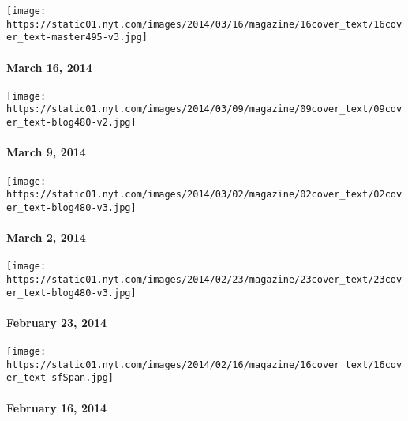 \href{http://www.nytimes.com/indexes/2014/03/16/magazine/index.html}{}

\texttt{[image: https://static01.nyt.com/images/2014/03/16/magazine/16cover\_text/16cover\_text-master495-v3.jpg]}

\hypertarget{march-16-2014}{%
\paragraph{March 16, 2014}\label{march-16-2014}}

\href{http://www.nytimes.com/indexes/2014/03/09/magazine/index.html}{}

\texttt{[image: https://static01.nyt.com/images/2014/03/09/magazine/09cover\_text/09cover\_text-blog480-v2.jpg]}

\hypertarget{march-9-2014}{%
\paragraph{March 9, 2014}\label{march-9-2014}}

\href{http://www.nytimes.com/indexes/2014/03/02/magazine/index.html}{}

\texttt{[image: https://static01.nyt.com/images/2014/03/02/magazine/02cover\_text/02cover\_text-blog480-v3.jpg]}

\hypertarget{march-2-2014}{%
\paragraph{March 2, 2014}\label{march-2-2014}}

\href{http://www.nytimes.com/indexes/2014/02/23/magazine/index.html}{}

\texttt{[image: https://static01.nyt.com/images/2014/02/23/magazine/23cover\_text/23cover\_text-blog480-v3.jpg]}

\hypertarget{february-23-2014}{%
\paragraph{February 23, 2014}\label{february-23-2014}}

\href{http://www.nytimes.com/indexes/2014/02/16/magazine/index.html}{}

\texttt{[image: https://static01.nyt.com/images/2014/02/16/magazine/16cover\_text/16cover\_text-sfSpan.jpg]}

\hypertarget{february-16-2014}{%
\paragraph{February 16, 2014}\label{february-16-2014}}

